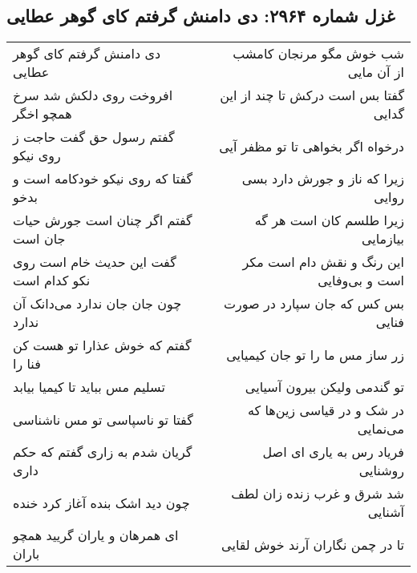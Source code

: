 \begin{center}
\section*{غزل شماره ۲۹۶۴: دی دامنش گرفتم کای گوهر عطایی}
\label{sec:2964}
\begin{longtable}{l p{0.5cm} r}
دی دامنش گرفتم کای گوهر عطایی
&&
شب خوش مگو مرنجان کامشب از آن مایی
\\
افروخت روی دلکش شد سرخ همچو اخگر
&&
گفتا بس است درکش تا چند از این گدایی
\\
گفتم رسول حق گفت حاجت ز روی نیکو
&&
درخواه اگر بخواهی تا تو مظفر آیی
\\
گفتا که روی نیکو خودکامه است و بدخو
&&
زیرا که ناز و جورش دارد بسی روایی
\\
گفتم اگر چنان است جورش حیات جان است
&&
زیرا طلسم کان است هر گه بیازمایی
\\
گفت این حدیث خام است روی نکو کدام است
&&
این رنگ و نقش دام است مکر است و بی‌وفایی
\\
چون جان جان ندارد می‌دانک آن ندارد
&&
بس کس که جان سپارد در صورت فنایی
\\
گفتم که خوش عذارا تو هست کن فنا را
&&
زر ساز مس ما را تو جان کیمیایی
\\
تسلیم مس بباید تا کیمیا بیابد
&&
تو گندمی ولیکن بیرون آسیایی
\\
گفتا تو ناسپاسی تو مس ناشناسی
&&
در شک و در قیاسی زین‌ها که می‌نمایی
\\
گریان شدم به زاری گفتم که حکم داری
&&
فریاد رس به یاری ای اصل روشنایی
\\
چون دید اشک بنده آغاز کرد خنده
&&
شد شرق و غرب زنده زان لطف آشنایی
\\
ای همرهان و یاران گریید همچو باران
&&
تا در چمن نگاران آرند خوش لقایی
\\
\end{longtable}
\end{center}
